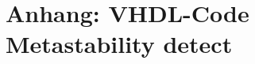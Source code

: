\chapter{Anhang: VHDL-Code Metastability detect }\label{chap.anhang_2.vhdl_metastability}
%
%
%
%
%
%
%
%
%
%
%
%
%
%	
%
%	
%
%	
